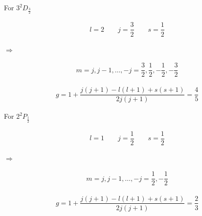 \documentclass{article}
\begin{document}
For $3^2 D_{\frac{3}{2} }$

\begin{equation*}
  \begin{aligned}
    l = 2 \quad\quad
    j = \dfrac{3}{2} \quad\quad
    s = \dfrac{1}{2}
  \end{aligned}
\end{equation*}

$\Rightarrow $

\begin{equation*}
  \begin{aligned}
    m = j, j - 1, \dots, -j = \dfrac{3}{2} , \dfrac{1}{2} , - \dfrac{1}{2} , - \dfrac{3}{2}   
  \end{aligned}
\end{equation*}

\begin{equation*}
  \begin{aligned}
    g = 1 + \dfrac{j \left( j + 1 \right) - l \left( l + 1 \right) + s \left( s + 1 \right)}{2 j \left( j + 1 \right)} = \dfrac{4}{5} 
  \end{aligned}
\end{equation*}

For $2^2 P_{\frac{1}{2} }$

\begin{equation*}
  \begin{aligned}
    l = 1 \quad\quad
    j = \dfrac{1}{2} \quad\quad
    s = \dfrac{1}{2}
  \end{aligned}
\end{equation*}

$\Rightarrow $

\begin{equation*}
  \begin{aligned}
    m = j, j - 1, \dots, -j = \dfrac{1}{2} , - \dfrac{1}{2}   
  \end{aligned}
\end{equation*}

\begin{equation*}
  \begin{aligned}
    g = 1 + \dfrac{j \left( j + 1 \right) - l \left( l + 1 \right) + s \left( s + 1 \right)}{2 j \left( j + 1 \right)} = \dfrac{2}{3} 
  \end{aligned}
\end{equation*}
\end{document}
